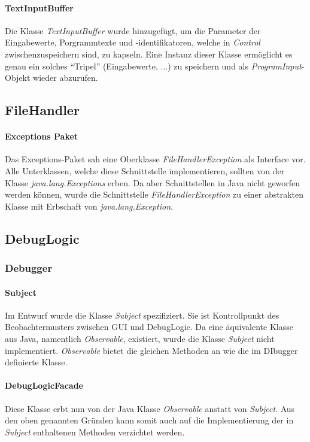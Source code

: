 \documentclass[parskip=full]{scrartcl}
\begin{document}
\paragraph{TextInputBuffer}
Die Klasse \textit{TextInputBuffer} wurde hinzugefügt, um die Parameter der Eingabewerte, Porgrammtexte und -identifikatoren, welche in \textit{Control} zwischenzuspeichern sind, zu kapseln.
Eine Instanz dieser Klasse ermöglicht es genau ein solches \enquote{Tripel} (Eingabewerte, ...) zu speichern und als \textit{ProgramInput}-Objekt wieder abzurufen.
\subsection{FileHandler}
\paragraph{Exceptions Paket}
Das Exceptions-Paket sah eine Oberklasse \textit{FileHandlerException} als Interface vor.
Alle Unterklassen, welche diese Schnittstelle implementieren, sollten von der Klasse \textit{java.lang.Exceptions} erben. Da aber Schnittstellen in Java nicht geworfen werden können, wurde die Schnittstelle \textit{FileHandlerException} zu einer abstrakten Klasse mit Erbschaft von \textit{java.lang.Exception}.
\subsection{DebugLogic}
\subsubsection{Debugger}
\paragraph{Subject}
Im Entwurf wurde die Klasse \textit{Subject} spezifiziert. Sie ist Kontrollpunkt des Beobachtermusters zwischen GUI und DebugLogic. Da eine äquivalente Klasse aus Java, namentlich \textit{Observable}, existiert, wurde die Klasse \textit{Subject} nicht implementiert.
\textit{Observable} bietet die gleichen Methoden an wie die im DIbugger definierte Klasse.
\paragraph{DebugLogicFacade}
Diese Klasse erbt nun von der Java Klasse \textit{Observable} anstatt von \textit{Subject}.
Aus den oben genannten Gründen kann somit auch auf die Implementierung der in \textit{Subject} enthaltenen Methoden verzichtet werden.
\end{document}
